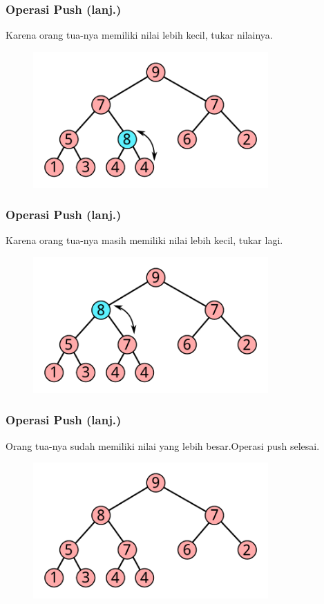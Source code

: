 \begin{frame}
\frametitle{Operasi Push (lanj.)}
Karena orang tua-nya memiliki nilai lebih kecil, tukar nilainya.
\begin{figure}
  \includegraphics[width=9cm]{asset/push-2.pdf}
\end{figure}
\end{frame}

\begin{frame}
\frametitle{Operasi Push (lanj.)}
Karena orang tua-nya masih memiliki nilai lebih kecil, tukar lagi.
\begin{figure}
  \includegraphics[width=9cm]{asset/push-3.pdf}
\end{figure}
\end{frame}

\begin{frame}
\frametitle{Operasi Push (lanj.)}
Orang tua-nya sudah memiliki nilai yang lebih besar.\newline Operasi push selesai.
\begin{figure}
  \includegraphics[width=9cm]{asset/push-4.pdf}
\end{figure}
\end{frame}

